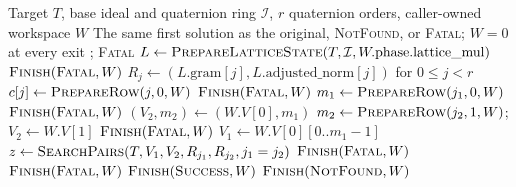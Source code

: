 \documentclass[a4paper,10pt]{article}
\theoremstyle{definition}
\theoremstyle{remark}
\begin{document}
\begin{algorithm}[H]
  \caption{Proposed v2 \texttt{find\_uv}: validate all rows before searching two at a time}
  \label{alg:two-row-schedule}
  \small
  \begin{algorithmic}[1]
    \Require Target $T$, base ideal and quaternion ring $\mathcal I$, $r$ quaternion orders, caller-owned workspace $W$
    \Ensure The same first solution as the original, \textsc{NotFound}, or \textsc{Fatal}; $W=0$ at every exit
        \State {}; \State \Return \textsc{Fatal}
      \EndIf
      \State {}
      \State $L\gets\Call{PrepareLatticeState}{T,\mathcal I,W.\mathrm{phase}.\mathrm{lattice\_mul}}$
       \State \Return $\Call{Finish}{\textsc{Fatal},W}$ \EndIf
      \State $R_j\gets(L.\mathrm{gram}[j],L.\mathrm{adjusted\_norm}[j])$ for $0\leq j<r$
      \State {} 
       
        \State $c[j]\gets\Call{PrepareRow}{j,0,W}$
         \State \Return $\Call{Finish}{\textsc{Fatal},W}$ \EndIf
      \EndFor
        \State $m_1\gets\Call{PrepareRow}{j_1,0,W}$
         \State \Return $\Call{Finish}{\textsc{Fatal},W}$ \EndIf
            \State $(V_2,m_2)\gets(W.V[0],m_1)$ 
          \Else
            \State $m_2\gets\Call{PrepareRow}{j_2,1,W}$; $V_2\gets W.V[1]$
             \State \Return $\Call{Finish}{\textsc{Fatal},W}$ \EndIf
          \EndIf
          \State $V_1\gets W.V[0][0..m_1-1]$
          \State $z\gets\Call{SearchPairs}{T,V_1,V_2,R_{j_1},R_{j_2},j_1=j_2}$
           \State \Return $\Call{Finish}{\textsc{Fatal},W}$ \EndIf
              \State \Return $\Call{Finish}{\textsc{Fatal},W}$
            \EndIf
            \State \Return $\Call{Finish}{\textsc{Success},W}$
          \EndIf
        \EndFor
      \EndFor
      \State \Return $\Call{Finish}{\textsc{NotFound},W}$
    \EndFunction
  \end{algorithmic}
\end{algorithm}
\end{document}
